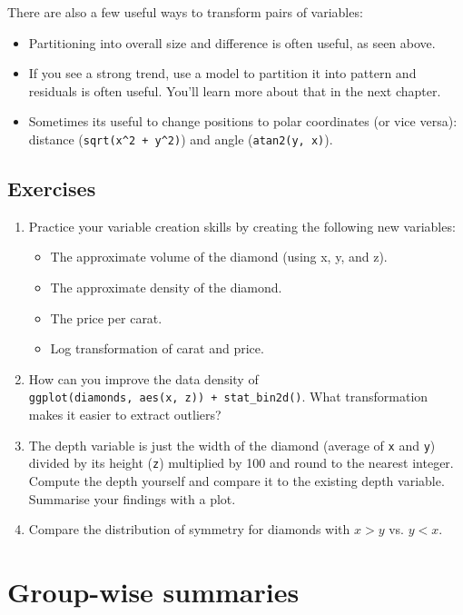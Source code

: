 There are also a few useful ways to transform pairs of variables:

\begin{itemize}
\item
  Partitioning into overall size and difference is often useful, as seen
  above.
\item
  If you see a strong trend, use a model to partition it into pattern
  and residuals is often useful. You'll learn more about that in the
  next chapter.
\item
  Sometimes its useful to change positions to polar coordinates (or vice
  versa): distance (\texttt{sqrt(x\^{}2\ +\ y\^{}2)}) and angle
  (\texttt{atan2(y,\ x)}).
\end{itemize}

\subsection{Exercises}

\begin{enumerate}
\def\labelenumi{\arabic{enumi}.}
\item
  Practice your variable creation skills by creating the following new
  variables:

  \begin{itemize}
  \tightlist
  \item
    The approximate volume of the diamond (using x, y, and z).
  \item
    The approximate density of the diamond.
  \item
    The price per carat.
  \item
    Log transformation of carat and price.
  \end{itemize}
\item
  How can you improve the data density of
  \texttt{ggplot(diamonds,\ aes(x,\ z))\ +\ stat\_bin2d()}. What
  transformation makes it easier to extract outliers?
\item
  The depth variable is just the width of the diamond (average of
  \texttt{x} and \texttt{y}) divided by its height (\texttt{z})
  multiplied by 100 and round to the nearest integer. Compute the depth
  yourself and compare it to the existing depth variable. Summarise your
  findings with a plot.
\item
  Compare the distribution of symmetry for diamonds with \(x > y\) vs.
  \(y < x\).
\end{enumerate}

\section{Group-wise summaries}\label{sec:summarise}

